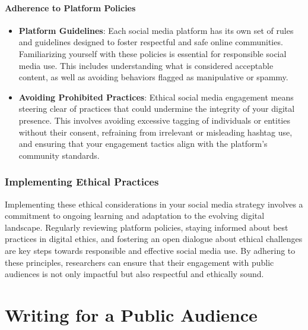 \documentclass[
]{book}
\begin{document}
\hypertarget{adherence-to-platform-policies}{%
\subsubsection*{Adherence to Platform Policies}\label{adherence-to-platform-policies}}

\begin{itemize}
\item
  \textbf{Platform Guidelines}: Each social media platform has its own set of rules and guidelines designed to foster respectful and safe online communities. Familiarizing yourself with these policies is essential for responsible social media use. This includes understanding what is considered acceptable content, as well as avoiding behaviors flagged as manipulative or spammy.
\item
  \textbf{Avoiding Prohibited Practices}: Ethical social media engagement means steering clear of practices that could undermine the integrity of your digital presence. This involves avoiding excessive tagging of individuals or entities without their consent, refraining from irrelevant or misleading hashtag use, and ensuring that your engagement tactics align with the platform's community standards.
\end{itemize}

\hypertarget{implementing-ethical-practices}{%
\subsection*{Implementing Ethical Practices}\label{implementing-ethical-practices}}

Implementing these ethical considerations in your social media strategy involves a commitment to ongoing learning and adaptation to the evolving digital landscape. Regularly reviewing platform policies, staying informed about best practices in digital ethics, and fostering an open dialogue about ethical challenges are key steps towards responsible and effective social media use. By adhering to these principles, researchers can ensure that their engagement with public audiences is not only impactful but also respectful and ethically sound.

\hypertarget{writing-for-a-public-audience}{%
\chapter{Writing for a Public Audience}\label{writing-for-a-public-audience}}
\end{document}
